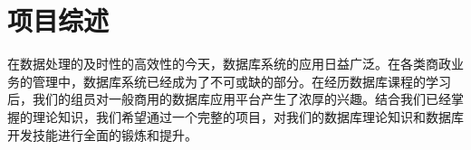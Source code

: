 \documentclass[../report.tex]{subfiles}
\begin{document}
\section{项目综述}

在数据处理的及时性的高效性的今天，数据库系统的应用日益广泛。在各类商政业务的管理中，数据库系统已经成为了不可或缺的部分。在经历数据库课程的学习后，我们的组员对一般商用的数据库应用平台产生了浓厚的兴趣。结合我们已经掌握的理论知识，我们希望通过一个完整的项目，对我们的数据库理论知识和数据库开发技能进行全面的锻炼和提升。
\end{document}
